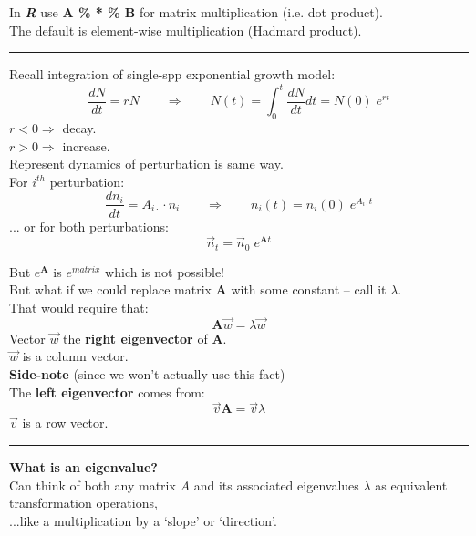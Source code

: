 \documentclass{article}
\newcommand{\note}[1]{\colorbox{gray!30}{#1}}
\newcommand{\ind}{\-\hspace{1cm}}
\begin{document}
\note{In \emph{\textbf{R}} use \textbf{A \% * \% B} for matrix multiplication (i.e. dot product).}\\
\ind \note{The default is element-wise multiplication (Hadmard product).}

\rule[0.5ex]{\linewidth}{1pt}

Recall integration of single-spp exponential growth model:
\begin{equation*}
	\frac{dN}{dt}=rN \quad \quad \Rightarrow \quad \quad N(t) = \int_{0}^{t} \frac{dN}{dt} dt = N(0) \; e^{rt}
\end{equation*}
\ind  $r<0 \Rightarrow$ decay.\\
\ind  $r>0 \Rightarrow$ increase.\\

Represent dynamics of perturbation is same way.\\
\ind For $i^{th}$ perturbation:
\begin{equation*}
	\frac{d n_i}{dt}= A_{i\cdot} \cdot n_i \quad \quad \Rightarrow \quad \quad n_i(t) = n_i(0) \; e^{A_{i \cdot}t}
\end{equation*} 
\ind ... or for both perturbations:
\begin{equation*}
	\vec{n}_t = \vec{n}_0 \; e^{\mathbf{A}t}
\end{equation*}

But $e^\mathbf{A}$ is $e^{matrix}$ which is not possible!\\

But what if we could replace matrix $\mathbf{A}$ with some constant -- call it $\lambda$.\\
That would require that:
\begin{equation*}
	\boxed{\mathbf{A} \vec{w} = \lambda \vec{w}}
\end{equation*}
Vector $\vec{w}$ the \textbf{right eigenvector} of $\mathbf{A}$.\\
\ind $\vec{w}$ is a column vector.\\


\textbf{Side-note} (since we won't actually use this fact)\\
\ind The \textbf{left eigenvector} comes from:
\begin{equation*}
	\vec{v}\mathbf{A} = \vec{v}\lambda
\end{equation*}
\ind \ind $\vec{v}$ is a row vector.

\rule[0.5ex]{\linewidth}{1pt}
\pagebreak

\textbf{What is an eigenvalue?}\\
Can think of both any matrix $A$ and its associated eigenvalues $\lambda$ as equivalent transformation operations,\\
\ind ...like a multiplication by a `slope' or `direction'.\\
\end{document}
